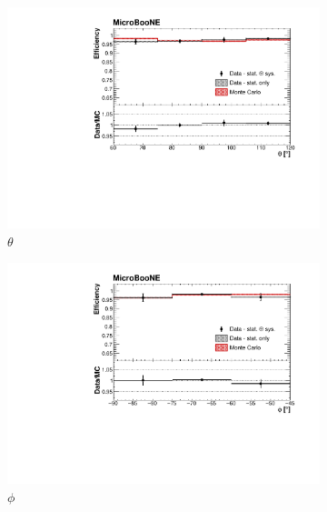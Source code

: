 \documentclass[a4paper,11pt]{article}
\begin{document}
\begin{figure}[htbp]
  \begin{center}
    \begin{subfigure}{0.61\textwidth}
      \includegraphics[width=\linewidth]{figures/theta2.pdf}
      \caption{$\theta$} \label{fig:theta}
    \end{subfigure}
    \begin{subfigure}{0.61\textwidth}
      \includegraphics[width=\linewidth]{figures/phi2.pdf}
      \caption{$\phi$} \label{fig:phi}
    \end{subfigure}
    \begin{subfigure}{0.61\textwidth}

\end{subfigure}
\end{center}
\end{figure}
\end{document}
